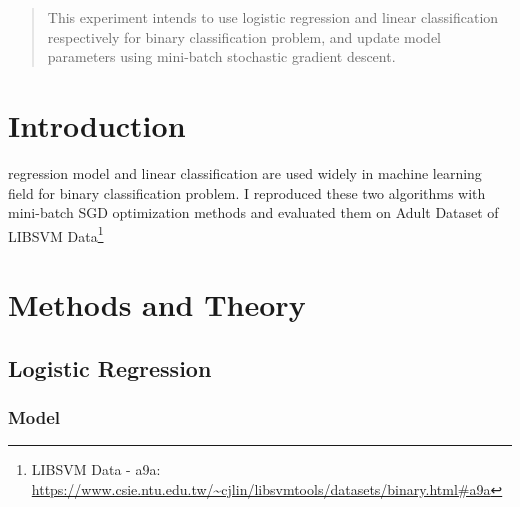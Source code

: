 \documentclass[journal, a4paper]{IEEEtran}
\begin{document}
\begin{abstract}
    This experiment intends to use logistic regression and linear classification respectively for binary classification problem, and update model parameters using mini-batch stochastic gradient descent.
\end{abstract}

\section{Introduction}
     regression model and linear classification are used widely in machine learning field for binary classification problem. I reproduced these two algorithms with mini-batch SGD optimization methods and evaluated them on Adult Dataset of LIBSVM Data\footnote{LIBSVM Data - a9a: \url{https://www.csie.ntu.edu.tw/~cjlin/libsvmtools/datasets/binary.html\#a9a}}

\section{Methods and Theory}
\subsection{Logistic Regression}

\subsubsection{Model}

\end{document}

